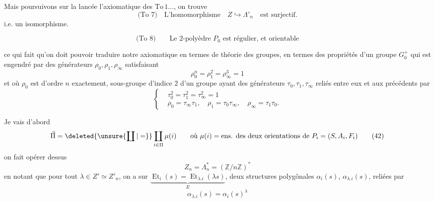 Mais poursuivons sur la lancée  l'axiomatique des $\mathrm{To}\,1\ldots$, on trouve
\[
 \text{(To 7)}\quad \text{L'homomorphisme}\quad Z\hookrightarrow\Lambda'_n\quad\text{est surjectif.}\tag*{(38)}
\]
i.e. un isomorphisme.


\[
 \text{(To 8)}\qquad\text{Le 2-polyèdre $P_0$ est régulier, et orientable}\tag*{(39)}
\]

ce qui fait qu'on doit pouvoir traduire notre axiomatique en termes de théorie des groupes,  en termes des propriétés d'un groupe $G_0^+$ qui est engendré par des générateurs $\rho_0,\rho_1,\rho_\infty$ satisfaisant
\[
 \boxed{\rho_0^n=\rho_1^2=\rho_\infty^3=1}\tag*{(40)}
\]
et où $\rho_0$ est d'ordre $n$ exactement, sous-groupe  d'indice 2 d'un groupe  ayant des générateurs $\tau_0,\tau_1,\tau_\infty$ reliés entre eux et aux précédents par
\[
 \left\{\begin{aligned}
 &\tau_0^2=\tau_1^2=\tau_\infty^2=1\\
 &\rho_0=\tau_\infty\tau_1,\quad \rho_1=\tau_0\tau_\infty,\quad
 \rho_\infty=\tau_1\tau_0 .
 \end{aligned}\right. \tag*{(41)}
\]

Je vais d'abord  
\[
 \vec\Pi=\deleted{\unsure{\coprod|=}}\coprod_{i\in\Pi}\mu(i)\qquad
 \text{où }\mu(i)=\text{ens. des deux orientations de }P_i=(S,A_i,F_i)\tag*{(42)}
\]
on fait opérer dessus 
\[
 Z_n=\Lambda_n^{*}=(\mathbb Z/n\mathbb Z)^*\tag*{(43)}
\]
en notant que pour tout   $\lambda\in Z'\simeq Z'_n$,  on a sur $\underbrace{\operatorname{Et}_i(s)=\operatorname{Et}_{\lambda.i}(\lambda s)}_{E}$, deux structures polygônales  $\alpha_i(s)$, $\alpha_{\lambda.i}(s)$, reliées par
\[
 \alpha_{\lambda.i}(s)=\alpha_i(s)^\lambda\tag*{(44)}
\]

